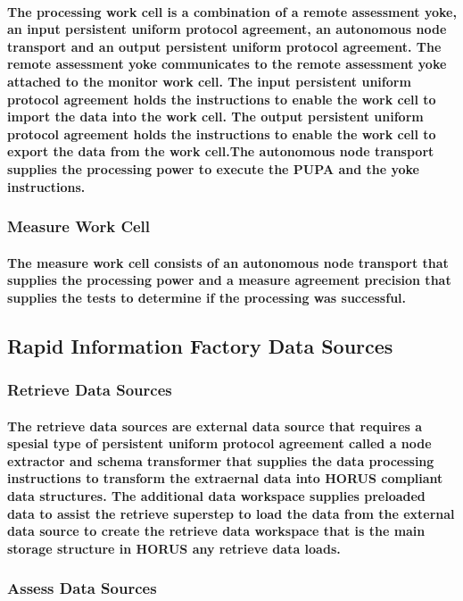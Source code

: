 \documentclass{acm_proc_article-sp}
\begin{document}
\paragraph{The processing work cell is a combination of a remote assessment yoke, an input persistent uniform protocol agreement, an autonomous node transport and an output persistent uniform protocol agreement. The remote assessment yoke communicates to the remote assessment yoke attached to the monitor work cell. The input persistent uniform protocol agreement holds the instructions to enable the work cell to import the data into the work cell. The output persistent uniform protocol agreement holds the instructions to enable the work cell to export the data from the work cell.The autonomous node transport supplies the processing power to execute the PUPA and the yoke instructions.}
\subsubsection{Measure Work Cell}
\paragraph{The measure work cell consists of an autonomous node transport that supplies the processing power and a measure agreement precision that supplies the tests to determine if the processing was successful.}
\pagebreak
\subsection{Rapid Information Factory Data Sources}
\subsubsection{Retrieve Data Sources}
\paragraph{The retrieve data sources are external data source that requires a spesial type of persistent uniform protocol agreement called a node extractor and schema transformer that supplies the data processing instructions to transform the extraernal data into HORUS compliant data structures. The additional data workspace supplies preloaded data to assist the retrieve superstep to load the data from the external data source to create the retrieve data workspace that is the main storage structure in HORUS any retrieve data loads.}
\subsubsection{Assess Data Sources}
\end{document}
